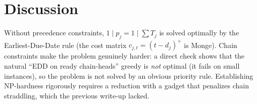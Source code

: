 \documentclass{amsart}
\theoremstyle{definition}
\theoremstyle{remark}
\begin{document}
\section{Discussion}

Without precedence constraints, $1\mid p_j=1\mid\sum T_j$ is solved optimally by the
Earliest-Due-Date rule (the cost matrix $c_{j,t}=(t-d_j)^{+}$ is Monge). Chain
constraints make the problem genuinely harder: a direct check shows that the natural
``EDD on ready chain-heads'' greedy is \emph{not} optimal (it fails on small instances),
so the problem is not solved by an obvious priority rule. Establishing NP-hardness
rigorously requires a reduction with a gadget that penalizes chain straddling, which the
previous write-up lacked.
\end{document}
